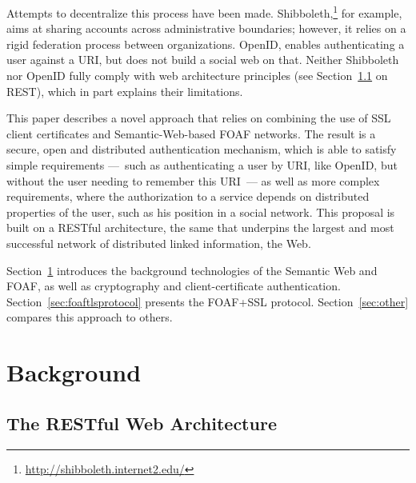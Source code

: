 \documentclass{llncs}
\begin{document}
Attempts to decentralize this process have been
made. Shibboleth,\footnote{\url{http://shibboleth.internet2.edu/}} for
example, aims at sharing accounts across administrative boundaries;
however, it relies on a rigid federation process between
organizations.  OpenID, enables authenticating a user against a URI,
but does not build a social web on that. Neither Shibboleth nor OpenID fully comply with web architecture principles (see Section~\ref{sec:rest} on REST), which in part explains their limitations.

This paper describes a novel approach that relies on combining the use
of SSL client certificates and Semantic-Web-based FOAF networks. The
result is a secure, open and distributed authentication mechanism,
which is able to satisfy simple requirements ---~such as authenticating
a user by URI, like OpenID, but without the user needing to remember this URI~--- 
as well as more complex requirements, where the authorization to a service 
depends on distributed properties of the user, such as his position 
in a social network. This proposal is built on
a RESTful architecture, the same that underpins the
largest and most successful network of distributed linked information,
the Web.

Section~\ref{sec:background} introduces the background technologies of
the Semantic Web and FOAF, as well as cryptography and
client-certificate authentication.  Section~\ref{sec:foaftlsprotocol}
presents the FOAF+SSL protocol.  Section~\ref{sec:other} compares this
approach to others.

\section{Background}
\label{sec:background}

\subsection{The RESTful Web Architecture}
\label{sec:rest}
\end{document}
